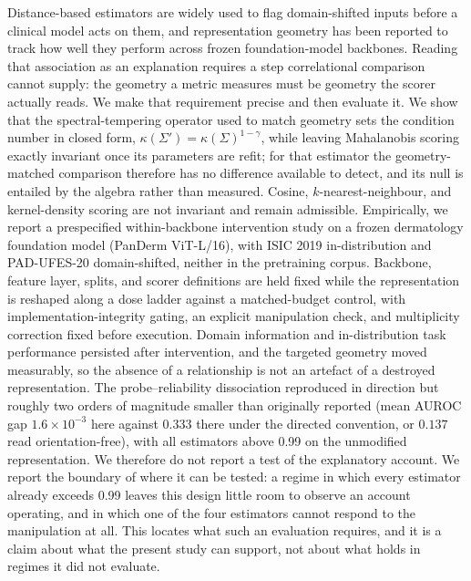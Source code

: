 Distance-based estimators are widely used to flag domain-shifted inputs before
a clinical model acts on them, and representation geometry has been reported to
track how well they perform across frozen foundation-model backbones. Reading
that association as an explanation requires a step correlational comparison
cannot supply: the geometry a metric measures must be geometry the scorer
actually reads. We make that requirement precise and then evaluate it. We show
that the spectral-tempering operator used to match geometry sets the condition
number in closed form, $\kappa(\Sigma')=\kappa(\Sigma)^{1-\gamma}$, while
leaving Mahalanobis scoring exactly invariant once its parameters are refit; for
that estimator the geometry-matched comparison therefore has no difference
available to detect, and its null is entailed by the algebra rather than
measured. Cosine, $k$-nearest-neighbour, and kernel-density scoring are not
invariant and remain admissible. Empirically, we report a prespecified
within-backbone intervention study on a frozen dermatology foundation model
(PanDerm ViT-L/16), with ISIC 2019 in-distribution and PAD-UFES-20
domain-shifted, neither in the pretraining corpus. Backbone, feature layer,
splits, and scorer definitions are held fixed while the representation is
reshaped along a dose ladder against a matched-budget control, with
implementation-integrity gating, an explicit manipulation check, and
multiplicity correction fixed before execution. Domain information and
in-distribution task performance persisted after intervention, and the targeted
geometry moved measurably, so the absence of a relationship is not an artefact
of a destroyed representation. The probe--reliability dissociation reproduced in
direction but roughly two orders of magnitude smaller than originally reported
(mean AUROC gap $1.6\times10^{-3}$ here against $0.333$ there under the
directed convention, or $0.137$ read orientation-free), with all estimators
above 0.99 on the unmodified representation. We therefore do not report a test of the
explanatory account. We report the boundary of where it can be tested: a regime
in which every estimator already exceeds 0.99 leaves this design little room to
observe an account operating, and in which one of the four estimators cannot
respond to the manipulation at all. This locates what such an evaluation
requires, and it is a claim about what the present study can support, not about
what holds in regimes it did not evaluate.
